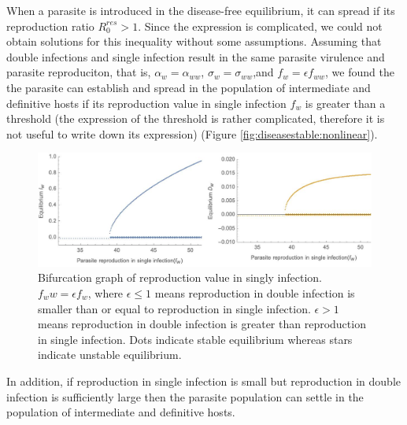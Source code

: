 \documentclass{article}
\begin{document}
When a parasite is introduced in the disease-free equilibrium, it can spread if its reproduction ratio $R_0^{res} > 1$. Since the expression is complicated, we could not obtain solutions for this inequality without some assumptions. Assuming that double infections and single infection result in the same parasite virulence and parasite reproduciton, that is, $\alpha_w = \alpha_{ww}$, $\sigma_w = \sigma_{ww}$,and $f_w = \epsilon f_{ww}$, we found the the parasite can establish and spread in the population of intermediate and definitive hosts if its reproduction value in single infection $f_w$ is greater than a threshold (the expression of the threshold is rather complicated, therefore it is not useful to write down its expression) (Figure \ref{fig:diseasestable:nonlinear}).

\begin{figure}
\includegraphics[width=\textwidth]{Figures/bifurcation_fw_NL.jpg}
\caption{Bifurcation graph of reproduction value in singly infection. $f_ww = \epsilon f_w$, where $\epsilon \leq 1$ means reproduction in double infection is smaller than or equal to reproduction in single infection. $\epsilon > 1$ means reproduction in double infection is greater than reproduction in single infection. Dots indicate stable equilibrium whereas stars indicate unstable equilibrium.}
\label{fig:bifurfw:nonlinear}
\end{figure}

In addition, if reproduction in single infection is small but reproduction in double infection is sufficiently large then the parasite population can settle in the population of intermediate and definitive hosts.
\end{document}
